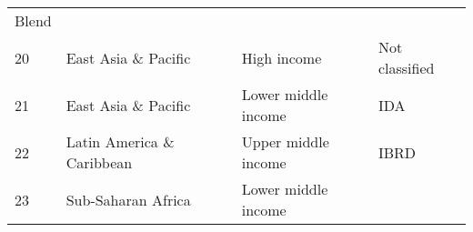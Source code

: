 \documentclass[
]{article}
\begin{document}
\begin{longtable}[]{@{}llll@{}}
\begin{minipage}[t]{0.16\columnwidth}
Blend\strut
\end{minipage}\tabularnewline
\begin{minipage}[t]{0.06\columnwidth}\raggedright
20\strut
\end{minipage} & \begin{minipage}[t]{0.17\columnwidth}\raggedright
East Asia \& Pacific\strut
\end{minipage} & \begin{minipage}[t]{0.11\columnwidth}\raggedright
High income\strut
\end{minipage} & \begin{minipage}[t]{0.16\columnwidth}\raggedright
Not classified\strut
\end{minipage}\tabularnewline
\begin{minipage}[t]{0.06\columnwidth}\raggedright
21\strut
\end{minipage} & \begin{minipage}[t]{0.17\columnwidth}\raggedright
East Asia \& Pacific\strut
\end{minipage} & \begin{minipage}[t]{0.11\columnwidth}\raggedright
Lower middle income\strut
\end{minipage} & \begin{minipage}[t]{0.16\columnwidth}\raggedright
IDA\strut
\end{minipage}\tabularnewline
\begin{minipage}[t]{0.06\columnwidth}\raggedright
22\strut
\end{minipage} & \begin{minipage}[t]{0.17\columnwidth}\raggedright
Latin America \& Caribbean\strut
\end{minipage} & \begin{minipage}[t]{0.11\columnwidth}\raggedright
Upper middle income\strut
\end{minipage} & \begin{minipage}[t]{0.16\columnwidth}\raggedright
IBRD\strut
\end{minipage}\tabularnewline
\begin{minipage}[t]{0.06\columnwidth}\raggedright
23\strut
\end{minipage} & \begin{minipage}[t]{0.17\columnwidth}\raggedright
Sub-Saharan Africa\strut
\end{minipage} & \begin{minipage}[t]{0.11\columnwidth}\raggedright
Lower middle income\strut
\end{minipage} & \begin{minipage}[t]{0.16\columnwidth}\raggedright

\end{minipage}
\end{longtable}
\end{document}
